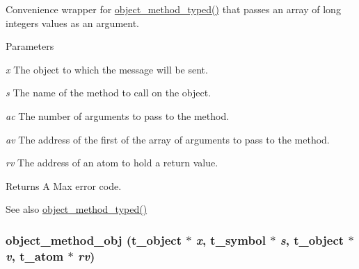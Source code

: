 Convenience wrapper for \hyperlink{group__obj_ga443dee482af22e0fe83e68955d367226}{object\_\-method\_\-typed()} that passes an array of long integers values as an argument. 
\begin{DoxyParams}{Parameters}
\item[{\em x}]The object to which the message will be sent. \item[{\em s}]The name of the method to call on the object. \item[{\em ac}]The number of arguments to pass to the method. \item[{\em av}]The address of the first of the array of arguments to pass to the method. \item[{\em rv}]The address of an atom to hold a return value.\end{DoxyParams}
\begin{DoxyReturn}{Returns}
A Max error code. 
\end{DoxyReturn}
\begin{DoxySeeAlso}{See also}
\hyperlink{group__obj_ga443dee482af22e0fe83e68955d367226}{object\_\-method\_\-typed()} 
\end{DoxySeeAlso}
\hypertarget{group__obj_ga5432f19c374fb8850faa7ff062561db0}{
\subsubsection[{object\_\-method\_\-obj}]{ object\_\-method\_\-obj ({\bf t\_\-object} $\ast$ {\em x}, \/  {\bf t\_\-symbol} $\ast$ {\em s}, \/  {\bf t\_\-object} $\ast$ {\em v}, \/  {\bf t\_\-atom} $\ast$ {\em rv})}}
\label{group__obj_ga5432f19c374fb8850faa7ff062561db0}


